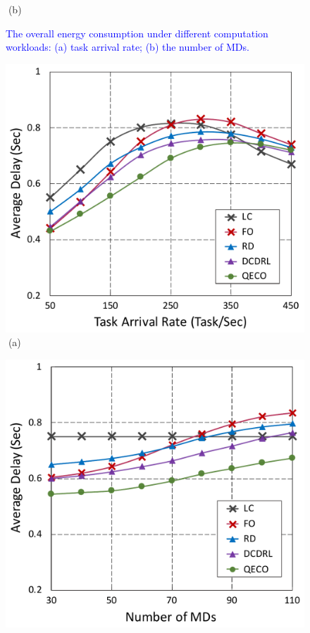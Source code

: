 \documentclass[12pt,draftclsnofoot,onecolumn]{IEEEtran}
\begin{document}
\begin{enumerate}
\begin{figure}[H]
\begin{minipage}[b]{0.33\linewidth}
		\textcolor{white}{i}\hspace{0.6cm}(b)
	\end{minipage}

	\caption{\textcolor{blue}{The overall energy consumption under different computation workloads: (a) task arrival rate; (b) the number of MDs.}}
	\label{chart2}
\end{figure}\vspace{-8mm}
\begin{figure}[H]\centering
	\captionsetup{name=Fig.}
	\begin{minipage}[b]{0.33\linewidth}
		\centering
		\includegraphics[width=\textwidth]{ delay_1} 		
		\textcolor{white}{i}\hspace{0.6cm}(a)
	\end{minipage}
	\hspace{-0.2cm}
	\begin{minipage}[b]{0.33\linewidth}
		\centering
		\includegraphics[width=\textwidth]{ delay_2}

\end{minipage}
\end{figure}
\end{enumerate}
\end{document}
